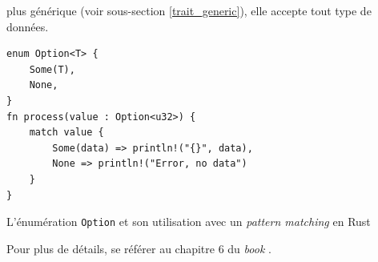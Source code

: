plus générique (voir sous-section \ref{trait_generic}), elle accepte tout type de données.
\bigbreak
\begin{code}
    \begin{verbatim}
enum Option<T> {
    Some(T),
    None,
}
fn process(value : Option<u32>) {
    match value {
        Some(data) => println!("{}", data),
        None => println!("Error, no data")
    }
}
    \end{verbatim}
    \caption{L'énumération \texttt{Option} et son utilisation avec un \textit{pattern matching} en Rust}
    \label{rust_option}
\end{code}
\bigbreak
Pour plus de détails, se référer au chapitre 6 du \textit{book} \cite{ref0}.


